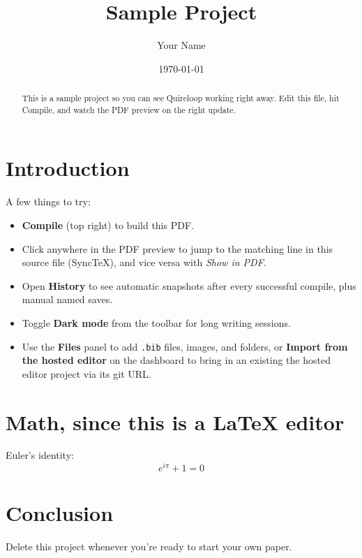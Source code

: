 \documentclass{article}
\title{Sample Project}
\author{Your Name}
\date{\today}
\begin{document}
\maketitle

\begin{abstract}
This is a sample project so you can see Quireloop working right away.
Edit this file, hit Compile, and watch the PDF preview on the right update.
\end{abstract}

\section{Introduction}
A few things to try:
\begin{itemize}
  \item \textbf{Compile} (top right) to build this PDF.
  \item Click anywhere in the PDF preview to jump to the matching line in this
    source file (SyncTeX), and vice versa with \emph{Show in PDF}.
  \item Open \textbf{History} to see automatic snapshots after every
    successful compile, plus manual named saves.
  \item Toggle \textbf{Dark mode} from the toolbar for long writing sessions.
  \item Use the \textbf{Files} panel to add \texttt{.bib} files, images, and
    folders, or \textbf{Import from the hosted editor} on the dashboard to bring in an
    existing the hosted editor project via its git URL.
\end{itemize}

\section{Math, since this is a LaTeX editor}
Euler's identity:
\[
  e^{i\pi} + 1 = 0
\]

\section{Conclusion}
Delete this project whenever you're ready to start your own paper.
\end{document}
